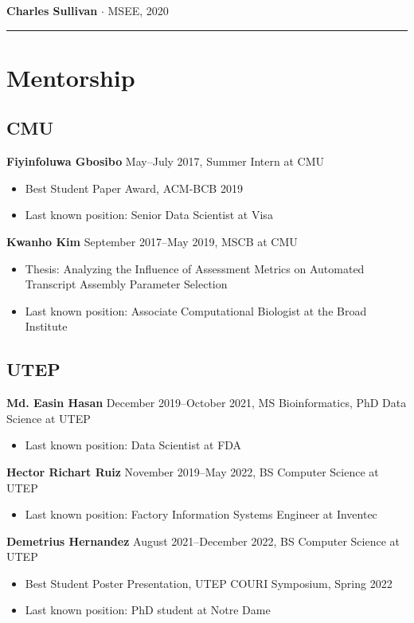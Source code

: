 \documentclass[10pt,letterpaper]{article}
\newcommand{\bigdot}{$\cdot$\xspace}
\newcommand{\cvsection}[1]{%
    \par\vspace{10pt}%
  \noindent\rule{\linewidth}{0.4pt}\par
  \vspace{-5.5ex}%
  \section*{#1}%
}
\begin{document}
\textbf{Charles Sullivan} \bigdot MSEE, 2020

\cvsection{Mentorship}
\subsection*{CMU}
\hspace{1.5em}\textbf{Fiyinfoluwa Gbosibo} May--July 2017, Summer Intern at CMU
\begin{itemize}
\item Best Student Paper Award, ACM-BCB 2019
\item Last known position: Senior Data Scientist at Visa
\end{itemize}

\textbf{Kwanho Kim} September 2017--May 2019, MSCB at CMU
\begin{itemize}
\item Thesis: Analyzing the Influence of Assessment Metrics on Automated Transcript Assembly Parameter Selection
\item Last known position: Associate Computational Biologist at the Broad Institute 
\end{itemize}

\subsection*{UTEP}
\hspace{1.5em}\textbf{Md. Easin Hasan} December 2019--October 2021, MS Bioinformatics, PhD Data Science at UTEP
\begin{itemize}
\item Last known position: Data Scientist at FDA
\end{itemize}

\textbf{Hector Richart Ruiz} November 2019--May 2022, BS Computer Science at UTEP
\begin{itemize}
\item Last known position: Factory Information Systems Engineer at Inventec
\end{itemize}

\textbf{Demetrius Hernandez} August 2021--December 2022, BS Computer Science at UTEP
\begin{itemize}
\item Best Student Poster Presentation, UTEP COURI Symposium, Spring 2022 
\item Last known position: PhD student at Notre Dame
\end{itemize}
\end{document}
